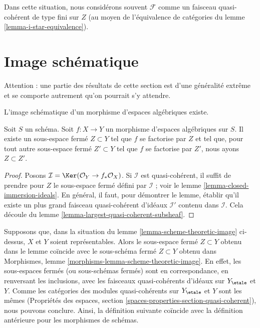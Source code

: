 \noindent
Dans cette situation, nous considérons souvent $\mathcal{F}$ comme un faisceau
quasi-cohérent de type fini sur $Z$ (au moyen de l'équivalence de catégories du
lemme \ref{lemma-i-star-equivalence}).






\section{Image schématique}
\label{section-scheme-theoretic-image}

\noindent
Attention : une partie des résultats de cette section est d'une généralité extrême
et se comporte autrement qu'on pourrait s'y attendre.

\begin{lemma}
\label{lemma-scheme-theoretic-image}
\begin{slogan}
L'image schématique d'un morphisme d'espaces algébriques existe.
\end{slogan}
Soit $S$ un schéma. Soit $f : X \to Y$ un morphisme d'espaces algébriques
sur $S$. Il existe un sous-espace fermé $Z \subset Y$ tel que $f$ se factorise
par $Z$ et tel que, pour tout autre sous-espace fermé $Z' \subset Y$ tel que
$f$ se factorise par $Z'$, nous ayons $Z \subset Z'$.
\end{lemma}

\begin{proof}
Posons $\mathcal{I} = \Ker(\mathcal{O}_Y \to f_*\mathcal{O}_X)$.
Si $\mathcal{I}$ est quasi-cohérent, il suffit de prendre pour $Z$ le
sous-espace fermé défini par $\mathcal{I}$ ; voir
le lemme \ref{lemma-closed-immersion-ideals}.
En général, il faut, pour démontrer le lemme, établir qu'il existe
un plus grand faisceau quasi-cohérent d'idéaux $\mathcal{I}'$ contenu dans
$\mathcal{I}$.
Cela découle du lemme \ref{lemma-largest-quasi-coherent-subsheaf}.
\end{proof}

\noindent
Supposons que, dans la situation du lemme \ref{lemma-scheme-theoretic-image}
ci-dessus, $X$ et $Y$ soient représentables. Alors le sous-espace fermé $Z \subset Y$
obtenu dans le lemme coïncide avec le sous-schéma fermé $Z \subset Y$ obtenu dans
Morphismes, lemme \ref{morphisms-lemma-scheme-theoretic-image}.
En effet, les sous-espaces fermés (ou sous-schémas fermés) sont en correspondance,
en renversant les inclusions, avec les faisceaux quasi-cohérents d'idéaux sur
$Y_\etale$ et $Y$. Comme les catégories des modules quasi-cohérents
sur $Y_\etale$ et $Y$ sont les mêmes
(Propriétés des espaces, section \ref{spaces-properties-section-quasi-coherent}),
nous pouvons conclure. Ainsi, la définition suivante coïncide avec la définition
antérieure pour les morphismes de schémas.

